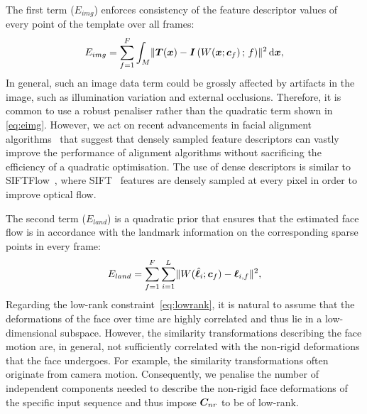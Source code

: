 The first term ($E_{img}$) enforces consistency of the feature descriptor values
of every point of the template over all frames:
\begin{equation}\label{eq:eimg}
    E_{img} = \sum_{f=1}^F \int_M  \lVert{} 
                \boldsymbol{T}(\boldsymbol{x}) -
               \boldsymbol{I}\left( W(\boldsymbol{x};\boldsymbol{c}_f) \,;\, f \right)
              \rVert^2  \, \mathrm{d} \boldsymbol{x},
\end{equation}
In general, such an image data term could be grossly affected by artifacts in the
image, such as illumination variation and external occlusions. Therefore, it is
common to use a robust penaliser rather than the quadratic term shown in
\cref{eq:eimg}. However, we act on recent advancements in facial alignment
algorithms~\cite{antonakos2015feature} that suggest that densely
sampled feature descriptors can vastly improve the performance of alignment
algorithms without sacrificing the efficiency of a quadratic optimisation.
The use of dense descriptors is similar to SIFTFlow~\cite{liu2011sift}, where
SIFT~\cite{lowe2004distinctive} features are densely sampled at every pixel in order
to improve optical flow.

The second term ($E_{land}$) is a quadratic prior that ensures that the estimated
face flow is in accordance with the landmark information on the corresponding
sparse points in every frame:
\begin{equation}
    E_{land} = \sum_{f=1}^F \sum_{i=1}^L \lVert{} 
                    W(\hat{\boldsymbol{\ell}}_i;\boldsymbol{c}_f) - \boldsymbol{\ell}_{i,f}
                 \rVert^2,
\end{equation}
Regarding the low-rank constraint~\cref{eq:lowrank}, it is natural to assume that the deformations
of the face over time are highly correlated and thus lie in a low-dimensional subspace.
However, the similarity transformations describing the face motion are, in general, not
sufficiently correlated with the non-rigid deformations that the face undergoes. For example,
the similarity transformations often originate from camera motion. Consequently, we penalise the number of
independent components needed to describe the non-rigid face deformations of the specific input
sequence and thus impose $\boldsymbol{C}_{nr}$ to be of low-rank.
